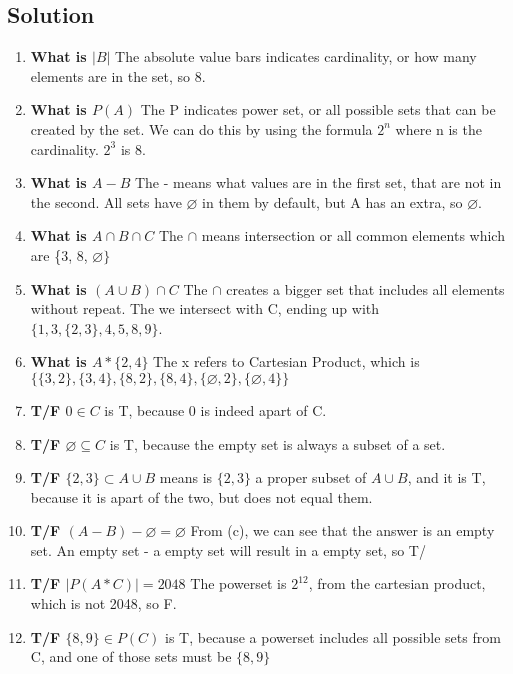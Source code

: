 \documentclass[11pt]{article}
\begin{document}
    \subsection*{Solution}
    \begin{enumerate}[label=(\alph*)]
        \item \textbf{What is \(|B|\)} The absolute value bars indicates cardinality, or how many elements are in the set, so 8.\\
        \item \textbf{What is \(P(A)\)} The P indicates power set, or all possible sets that can be created by the set. We can do this by using the formula \(2^n\) where n is the cardinality. \(2^3\) is 8.\\
        \item \textbf{What is \(A-B\)} The - means what values are in the first set, that are not in the second. All sets have \(\varnothing\) in them by default, but A has an extra, so \(\varnothing.\)\\
        \item \textbf{What is \(A \cap B \cap C\)} The \(\cap\) means intersection or all common elements which are \{3, 8, \(\varnothing\}\) \\
        \item \textbf{What is \((A \cup B) \cap C\)} The \(\cap\) creates a bigger set that includes all elements without repeat. The we intersect with C, ending up with \(\{1, 3, \{2, 3\}, 4, 5, 8, 9\}\). \\
        \item \textbf{What is \(A *\{2,4\}\)} The x refers to Cartesian Product, which is \(\{\{3,2\},\{3,4\},\{8,2\},\{8,4\},\{\varnothing,2\},\{\varnothing,4\}\}\) \\
        \item \textbf{T/F \(0 \in C\)} is T, because 0 is indeed apart of C.\\ 
        \item \textbf{T/F \(\varnothing \subseteq C\)} is T, because the empty set is always a subset of a set. \\
        \item \textbf{T/F \(\{2,3\} \subset A \cup B\)} means is \(\{2,3\}\) a proper subset of \(A \cup B\), and it is T, because it is apart of the two, but does not equal them. \\
        \item \textbf{T/F \((A-B) - \varnothing = \varnothing\)} From (c), we can see that the answer is an empty set. An empty set - a empty set will result in a empty set, so T/\\
        \item \textbf{T/F \(|P(A * C)| = 2048\)} The powerset is \(2^12\), from the cartesian product, which is not 2048, so F. \\
        \item \textbf{T/F \(\{8,9\} \in P(C)\)} is T, because a powerset includes all possible sets from C, and one of those sets must be \(\{8,9\}\) \\

    \end{enumerate}
\end{document}
